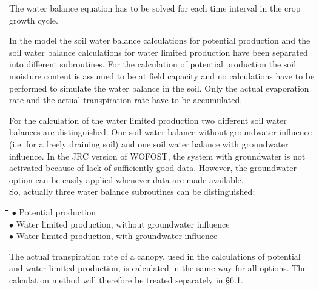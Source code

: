 \documentclass[11pt]{article}
\begin{document}
The water balance equation has to be solved for each time interval in the crop growth
cycle.

In the model the soil water balance calculations for potential production and the soil water
balance calculations for water limited production have been separated into different
subroutines. For the calculation of potential production the soil moisture content is
assumed to be at field capacity and no calculations have to be performed to simulate the
water balance in the soil. Only the actual evaporation rate and the actual transpiration rate
have to be accumulated. 

For the calculation of the water limited production two different soil water balances are
distinguished. One soil water balance without groundwater influence (i.e. for a freely
draining soil) and one soil water balance with groundwater influence. In the JRC version
of WOFOST, the system with groundwater is not activated because of lack of sufficiently
good data. However, the groundwater option can be easily applied whenever data are
made available.\\
 So, actually three water balance subroutines can be distinguished:\nwln
\begin{tabbing}
\hspace{1.27cm}\=\hspace{1.27cm}\=\hspace{1.27cm}\=\hspace{1.27cm}\=%
\hspace{1.27cm}\=\hspace{1.27cm}\=\hspace{1.27cm}\=\hspace{1.27cm}\=%
\hspace{1.27cm}\=\hspace{1.27cm}\=\kill
$\bullet$ Potential production \> \> \> \> \> \> \> \> \> \> [WATPP, \S  6.2]\\
$\bullet$ Water limited production, without groundwater influence\> \> \> \> \> \> \> \> \> \> [WATFD, \S  6.3]\\
$\bullet$ Water limited production, with groundwater influence\> \> \> \> \> \> \> \> \> \> [WATGW, \S  6.4]
\end{tabbing}

 \bigskip
The actual transpiration rate of a canopy, used in the calculations of potential and water
limited production, is calculated in the same way for all options. The calculation method
will therefore be treated separately in \S 6.1. 
\end{document}
